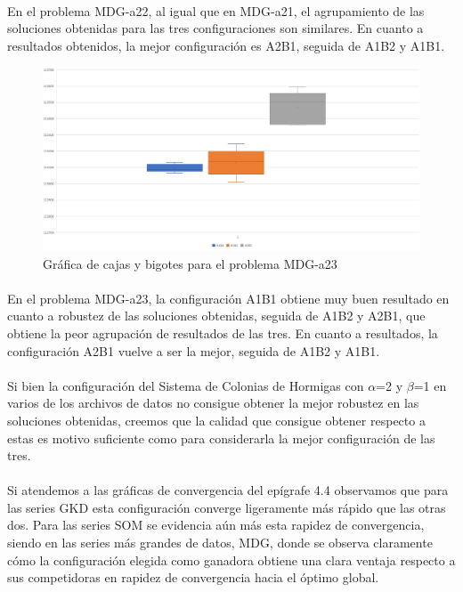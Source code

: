 	\paragraph{}En el problema MDG-a22, al igual que en MDG-a21, el agrupamiento de las soluciones obtenidas para las tres configuraciones son similares. En cuanto a resultados obtenidos, la mejor configuración es A2B1, seguida de A1B2 y A1B1.

	\begin{figure}[H]
		\centering
		\includegraphics[scale=0.3]{img/BIGOTESMDG3.png}
		\caption{Gráfica de cajas y bigotes para el problema MDG-a23}
		\label{MDG-a23_bigotes}
	\end{figure}

	\paragraph{}En el problema MDG-a23, la configuración A1B1 obtiene muy buen resultado en cuanto a robustez de las soluciones obtenidas, seguida de A1B2 y A2B1, que obtiene la peor agrupación de resultados de las tres. En cuanto a resultados, la configuración A2B1 vuelve a ser la mejor, seguida de A1B2 y A1B1.
	
	\paragraph{}Si bien la configuración del Sistema de Colonias de Hormigas con $\alpha$=2 y $\beta$=1 en varios de los archivos de datos no consigue obtener la mejor robustez en las soluciones obtenidas, creemos que la calidad que consigue obtener respecto a estas es motivo suficiente como para considerarla la mejor configuración de las tres.
	
	\paragraph{}Si atendemos a las gráficas de convergencia del epígrafe 4.4 observamos que para las series GKD esta configuración converge ligeramente más rápido que las otras dos. Para las series SOM se evidencia aún más esta rapidez de convergencia, siendo en las series más grandes de datos, MDG, donde se observa claramente cómo la configuración elegida como ganadora obtiene una clara ventaja respecto a sus competidoras en rapidez de convergencia hacia el óptimo global.
	
